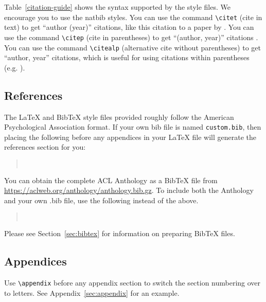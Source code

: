 \documentclass[11pt]{article}
\begin{document}
Table~\ref{citation-guide} shows the syntax supported by the style files.
We encourage you to use the natbib styles.
You can use the command \verb|\citet| (cite in text) to get ``author (year)'' citations, like this citation to a paper by \citet{Gusfield:97}.
You can use the command \verb|\citep| (cite in parentheses) to get ``(author, year)'' citations \citep{Gusfield:97}.
You can use the command \verb|\citealp| (alternative cite without parentheses) to get ``author, year'' citations, which is useful for using citations within parentheses (e.g. \citealp{Gusfield:97}).

\subsection{References}

\nocite{Ando2005,borschinger-johnson-2011-particle,andrew2007scalable,rasooli-tetrault-2015,goodman-etal-2016-noise,harper-2014-learning}

The \LaTeX{} and Bib\TeX{} style files provided roughly follow the American Psychological Association format.
If your own bib file is named \texttt{custom.bib}, then placing the following before any appendices in your \LaTeX{} file will generate the references section for you:
\begin{quote}
\begin{verbatim}


\end{verbatim}
\end{quote}
You can obtain the complete ACL Anthology as a Bib\TeX{} file from \url{https://aclweb.org/anthology/anthology.bib.gz}.
To include both the Anthology and your own .bib file, use the following instead of the above.
\begin{quote}
\begin{verbatim}


\end{verbatim}
\end{quote}
Please see Section~\ref{sec:bibtex} for information on preparing Bib\TeX{} files.

\subsection{Appendices}

Use \verb|\appendix| before any appendix section to switch the section numbering over to letters. See Appendix~\ref{sec:appendix} for an example.
\end{document}
